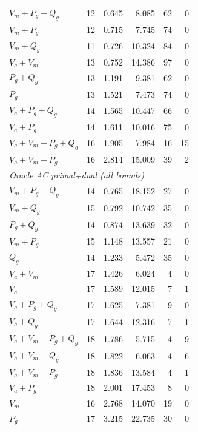 \begin{table}[!t]
\begin{tabular}{lrrrrr}
$V_m{+}P_g{+}Q_g$ & 12 & 0.645 & 8.085 & 62 & 0 \\
$V_m{+}P_g$ & 12 & 0.715 & 7.745 & 74 & 0 \\
$V_m{+}Q_g$ & 11 & 0.726 & 10.324 & 84 & 0 \\
$V_a{+}V_m$ & 13 & 0.752 & 14.386 & 97 & 0 \\
$P_g{+}Q_g$ & 13 & 1.191 & 9.381 & 62 & 0 \\
$P_g$ & 13 & 1.521 & 7.473 & 74 & 0 \\
$V_a{+}P_g{+}Q_g$ & 14 & 1.565 & 10.447 & 66 & 0 \\
$V_a{+}P_g$ & 14 & 1.611 & 10.016 & 75 & 0 \\
$V_a{+}V_m{+}P_g{+}Q_g$ & 16 & 1.905 & 7.984 & 16 & 15 \\
$V_a{+}V_m{+}P_g$ & 16 & 2.814 & 15.009 & 39 & 2 \\
\midrule
\multicolumn{6}{l}{\textit{Oracle AC primal+dual (all bounds)}} \\
$V_m{+}P_g{+}Q_g$ & 14 & 0.765 & 18.152 & 27 & 0 \\
$V_m{+}Q_g$ & 15 & 0.792 & 10.742 & 35 & 0 \\
$P_g{+}Q_g$ & 14 & 0.874 & 13.639 & 32 & 0 \\
$V_m{+}P_g$ & 15 & 1.148 & 13.557 & 21 & 0 \\
$Q_g$ & 14 & 1.233 & 5.472 & 35 & 0 \\
$V_a{+}V_m$ & 17 & 1.426 & 6.024 & 4 & 0 \\
$V_a$ & 17 & 1.589 & 12.015 & 7 & 1 \\
$V_a{+}P_g{+}Q_g$ & 17 & 1.625 & 7.381 & 9 & 0 \\
$V_a{+}Q_g$ & 17 & 1.644 & 12.316 & 7 & 1 \\
$V_a{+}V_m{+}P_g{+}Q_g$ & 18 & 1.786 & 5.715 & 4 & 9 \\
$V_a{+}V_m{+}Q_g$ & 18 & 1.822 & 6.063 & 4 & 6 \\
$V_a{+}V_m{+}P_g$ & 18 & 1.836 & 13.584 & 4 & 1 \\
$V_a{+}P_g$ & 18 & 2.001 & 17.453 & 8 & 0 \\
$V_m$ & 16 & 2.768 & 14.070 & 19 & 0 \\
$P_g$ & 17 & 3.215 & 22.735 & 30 & 0 \\
\bottomrule
\end{tabular}
\end{table}